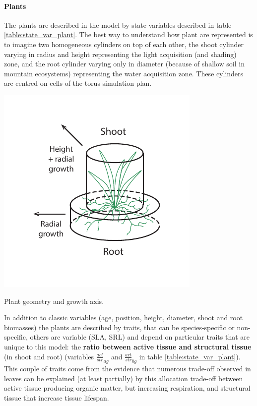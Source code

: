 \paragraph{Plants} The plants are described in the model by state variables described in table \ref{table:state_var_plant}. The best way to understand how plant are represented is to imagine two homogeneous cylinders on top of each other, the shoot cylinder varying in radius and height representing the light acquisition (and shading) zone, and the root cylinder varying only in diameter (because of shallow soil in mountain ecosystems) representing the water acquisition zone. These cylinders are centred on cells of the torus simulation plan.\\
\begin{marginfigure}
\includegraphics{./Figures/plant_geometry_m.pdf}
\caption{Plant geometry and growth axis.}
\end{marginfigure}
\indent In addition to classic variables (age, position, height, diameter, shoot and root biomasses) the plants are described by traits, that can be species-specific or non-specific, others are variable (SLA, SRL) and depend on particular traits that are unique to this model: the \textbf{ratio between active tissue and structural tissue} (in shoot and root) (variables $\frac{act}{str}_{ag}$ and $\frac{act}{str}_{bg}$ in table \ref{table:state_var_plant}). This couple of traits come from the evidence that numerous trade-off observed in leaves can be explained (at least partially) by this allocation trade-off between active tissue producing organic matter, but increasing respiration, and structural tissue that increase tissue lifespan.

